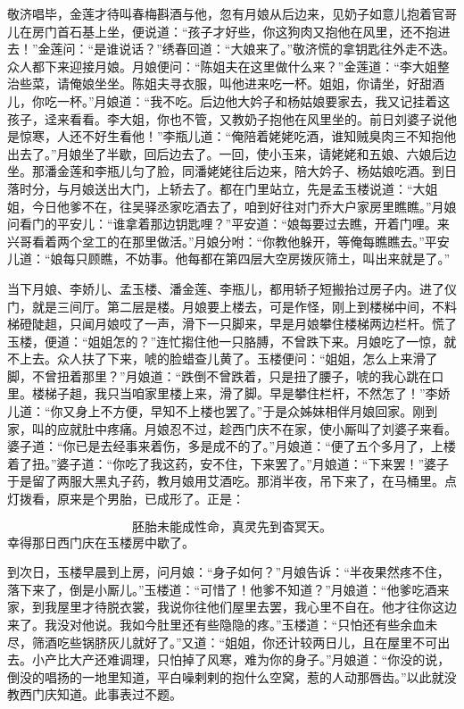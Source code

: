 敬济唱毕，金莲才待叫春梅斟酒与他，忽有月娘从后边来，见奶子如意儿抱着官哥儿在房门首石基上坐，便说道：“孩子才好些，你这狗肉又抱他在风里，还不抱进去！”金莲问：“是谁说话？”绣春回道：“大娘来了。”敬济慌的拿钥匙往外走不迭。众人都下来迎接月娘。月娘便问：“陈姐夫在这里做什么来？”金莲道：“李大姐整治些菜，请俺娘坐坐。陈姐夫寻衣服，叫他进来吃一杯。姐姐，你请坐，好甜酒儿，你吃一杯。”月娘道：“我不吃。后边他大妗子和杨姑娘要家去，我又记挂着这孩子，迳来看看。李大姐，你也不管，又教奶子抱他在风里坐的。前日刘婆子说他是惊寒，人还不好生看他！”李瓶儿道：“俺陪着姥姥吃酒，谁知贼臭肉三不知抱他出去了。”月娘坐了半歇，回后边去了。一回，使小玉来，请姥姥和五娘、六娘后边坐。那潘金莲和李瓶儿匀了脸，同潘姥姥往后边来，陪大妗子、杨姑娘吃酒。到日落时分，与月娘送出大门，上轿去了。都在门里站立，先是孟玉楼说道：“大姐姐，今日他爹不在，往吴驿丞家吃酒去了，咱到好往对门乔大户家房里瞧瞧。”月娘问看门的平安儿：“谁拿着那边钥匙哩？”平安道：“娘每要过去瞧，开着门哩。来兴哥看着两个坌工的在那里做活。”月娘分咐：“你教他躲开，等俺每瞧瞧去。”平安儿道：“娘每只顾瞧，不妨事。他每都在第四层大空房拨灰筛土，叫出来就是了。”

当下月娘、李娇儿、孟玉楼、潘金莲、李瓶儿，都用轿子短搬抬过房子内。进了仪门，就是三间厅。第二层是楼。月娘要上楼去，可是作怪，刚上到楼梯中间，不料梯磴陡趄，只闻月娘哎了一声，滑下一只脚来，早是月娘攀住楼梯两边栏杆。慌了玉楼，便道：“姐姐怎的？”连忙搊住他一只胳膊，不曾跌下来。月娘吃了一惊，就不上去。众人扶了下来，唬的脸蜡查儿黄了。玉楼便问：“姐姐，怎么上来滑了脚，不曾扭着那里？”月娘道：“跌倒不曾跌着，只是扭了腰子，唬的我心跳在口里。楼梯子趄，我只当咱家里楼上来，滑了脚。早是攀住栏杆，不然怎了！”李娇儿道：“你又身上不方便，早知不上楼也罢了。”于是众姊妹相伴月娘回家。刚到家，叫的应就肚中疼痛。月娘忍不过，趁西门庆不在家，使小厮叫了刘婆子来看。婆子道：“你已是去经事来着伤，多是成不的了。”月娘道：“便了五个多月了，上楼着了扭。”婆子道：“你吃了我这药，安不住，下来罢了。”月娘道：“下来罢！”婆子于是留了两服大黑丸子药，教月娘用艾酒吃。那消半夜，吊下来了，在马桶里。点灯拨看，原来是个男胎，已成形了。正是：

\[
胚胎未能成性命，真灵先到杳冥天。
\]
幸得那日西门庆在玉楼房中歇了。

到次日，玉楼早晨到上房，问月娘：“身子如何？”月娘告诉：“半夜果然疼不住，落下来了，倒是小厮儿。”玉楼道：“可惜了！他爹不知道？”月娘道：“他爹吃酒来家，到我屋里才待脱衣裳，我说你往他们屋里去罢，我心里不自在。他才往你这边来了。我没对他说。我如今肚里还有些隐隐的疼。”玉楼道：“只怕还有些余血未尽，筛酒吃些锅脐灰儿就好了。”又道：“姐姐，你还计较两日儿，且在屋里不可出去。小产比大产还难调理，只怕掉了风寒，难为你的身子。”月娘道：“你没的说，倒没的唱扬的一地里知道，平白噪剌剌的抱什么空窝，惹的人动那唇齿。”以此就没教西门庆知道。此事表过不题。

